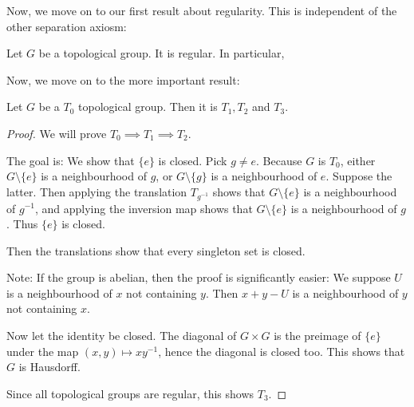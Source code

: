 \documentclass[prb,12pt]{revtex4-2}
\theoremstyle{definition}
\theoremstyle{definition}
\theoremstyle{definition}
\begin{document}
Now, we move on to our first result about regularity. This is independent of the other separation axiosm:
\begin{Theorem}
	Let $G$ be a topological group. It is regular. In particular,
\end{Theorem}
Now, we move on to the more important result:
	\begin{Theorem}
		Let $G$ be a $T_0$ topological group. Then it is $T_1, T_2$ and $T_3$.
	\end{Theorem} 
\begin{proof}
	We will prove $T_0\implies T_1\implies T_2$. 
	
	The goal is: We show that $\{e\}$ is closed. Pick $g\neq e$. Because $G$ is $T_0$, either $G \setminus \{e\}$ is a neighbourhood of $g$, or $G \setminus \{g\}$ is a neighbourhood of $e$. Suppose the latter. Then applying the translation $T_{g^{-1}}$ shows that $G \setminus \{e\}$ is a neighbourhood of $g^{-1}$, and applying the inversion map shows that $G \setminus \{e\}$ is a neighbourhood of $g$. Thus $\{e\}$ is closed.
	
	Then the translations show that every singleton set is closed.
	
	Note: If the group is abelian, then the proof is significantly easier: We suppose $U$ is a neighbourhood of $x$ not containing $y$. Then $x+y-U$ is a neighbourhood of $y$ not containing $x$. 
	
	Now let the identity be closed. The diagonal of $G\times G$ is the preimage of $\{e\}$ under the map $(x,y)\mapsto xy^{-1}$, hence the diagonal is closed too. This shows that $G$ is Hausdorff.
	
	Since all topological groups are regular, this shows $T_3$.
\end{proof}
\end{document}

